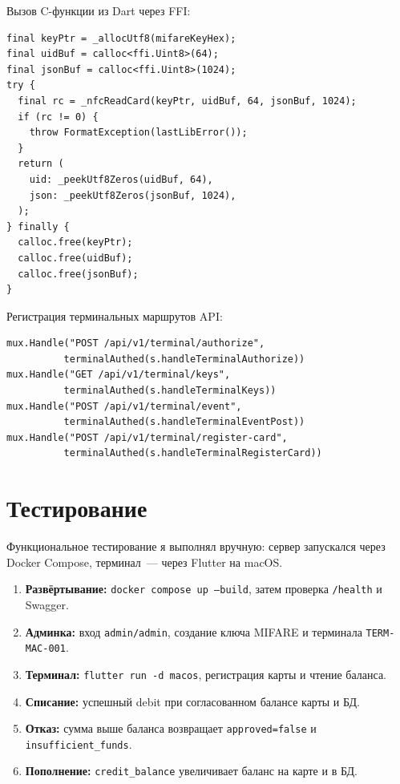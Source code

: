 \documentclass[language=russian]{bmstu}
\begin{document}
Вызов C-функции из Dart через FFI:

\begin{lstlisting}[frame=single]
final keyPtr = _allocUtf8(mifareKeyHex);
final uidBuf = calloc<ffi.Uint8>(64);
final jsonBuf = calloc<ffi.Uint8>(1024);
try {
  final rc = _nfcReadCard(keyPtr, uidBuf, 64, jsonBuf, 1024);
  if (rc != 0) {
    throw FormatException(lastLibError());
  }
  return (
    uid: _peekUtf8Zeros(uidBuf, 64),
    json: _peekUtf8Zeros(jsonBuf, 1024),
  );
} finally {
  calloc.free(keyPtr);
  calloc.free(uidBuf);
  calloc.free(jsonBuf);
}
\end{lstlisting}

Регистрация терминальных маршрутов API:

\begin{lstlisting}[frame=single]
mux.Handle("POST /api/v1/terminal/authorize",
          terminalAuthed(s.handleTerminalAuthorize))
mux.Handle("GET /api/v1/terminal/keys",
          terminalAuthed(s.handleTerminalKeys))
mux.Handle("POST /api/v1/terminal/event",
          terminalAuthed(s.handleTerminalEventPost))
mux.Handle("POST /api/v1/terminal/register-card",
          terminalAuthed(s.handleTerminalRegisterCard))
\end{lstlisting}

\chapter{Тестирование}

Функциональное тестирование я выполнял вручную: сервер запускался через Docker Compose, терминал~--- через Flutter на macOS.

\begin{enumerate}
  \item \textbf{Развёртывание:} \texttt{docker compose up --build}, затем проверка \texttt{/health} и Swagger.
  \item \textbf{Админка:} вход \texttt{admin/admin}, создание ключа MIFARE и терминала \texttt{TERM-MAC-001}.
  \item \textbf{Терминал:} \texttt{flutter run -d macos}, регистрация карты и чтение баланса.
  \item \textbf{Списание:} успешный debit при согласованном балансе карты и БД.
  \item \textbf{Отказ:} сумма выше баланса возвращает \texttt{approved=false} и \texttt{insufficient\_funds}.
  \item \textbf{Пополнение:} \texttt{credit\_balance} увеличивает баланс на карте и в БД.
\end{enumerate}
\end{document}
